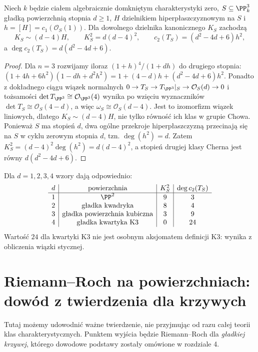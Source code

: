 \begin{wniosek}
\label{wn:ga7-degree-d-surface}
Niech $k$ będzie ciałem algebraicznie domkniętym
charakterystyki zero, $S\subseteq\PP^3_k$ gładką
powierzchnią stopnia $d\ge1$, $H$ dzielnikiem
hiperpłaszczyznowym na $S$ i $h=[H]=c_1(\mathcal O_S(1))$.
Dla dowolnego dzielnika kanonicznego $K_S$ zachodzą
\[
 K_S\sim(d-4)H,\qquad K_S^2=d(d-4)^2,\qquad
 c_2(T_S)=(d^2-4d+6)h^2,
\]
a $\deg c_2(T_S)=d(d^2-4d+6)$.
\end{wniosek}
\begin{proof}
Dla $n=3$ rozwijamy iloraz
$(1+h)^4/(1+dh)$ do drugiego stopnia:
$(1+4h+6h^2)(1-dh+d^2h^2)
=1+(4-d)h+(d^2-4d+6)h^2$.
Ponadto z dokładnego ciągu wiązek normalnych
$0\to T_S\to T_{\PP^3}|_S\to\mathcal O_S(d)\to0$
i tożsamości $\det T_{\PP^3}\cong\mathcal O_{\PP^3}(4)$
wynika po wzięciu wyznaczników
$\det T_S\cong\mathcal O_S(4-d)$, a więc
$\omega_S\cong\mathcal O_S(d-4)$.
Jest to izomorfizm wiązek liniowych, dlatego
$K_S\sim(d-4)H$, nie tylko równość ich klas w grupie Chowa.
Ponieważ $S$ ma stopień $d$, dwa ogólne przekroje
hiperpłaszczyzną przecinają się na $S$ w cyklu zerowym
stopnia $d$, tzn. $\deg(h^2)=d$.
Zatem $K_S^2=(d-4)^2\deg(h^2)=d(d-4)^2$,
a stopień drugiej klasy Cherna jest równy
$d(d^2-4d+6)$.
\end{proof}

\begin{przyklad}
\label{prz:ga7-surface-invariants}
Dla $d=1,2,3,4$ wzory dają odpowiednio:
\[
\begin{array}{c|c|c|c}
 d & \text{powierzchnia} & K_S^2 & \deg c_2(T_S)\\ \hline
 1 & \PP^2 & 9 & 3\\
 2 & \text{gładka kwadryka} & 8 & 4\\
 3 & \text{gładka powierzchnia kubiczna} & 3 & 9\\
 4 & \text{gładka kwartyka K3} & 0 & 24
\end{array}
\]
Wartość $24$ dla kwartyki K3 nie jest osobnym aksjomatem
definicji K3: wynika z obliczenia wiązki stycznej.
\end{przyklad}

\section{Riemann--Roch na powierzchniach: dowód z twierdzenia dla krzywych}
\label{sec:ga7-rr-surface}

Tutaj możemy udowodnić ważne twierdzenie, nie przyjmując
od razu całej teorii klas charakterystycznych. Punktem wyjścia
będzie Riemann--Roch dla \emph{gładkiej krzywej}, którego
dowodowe podstawy zostały omówione w rozdziale 4.


